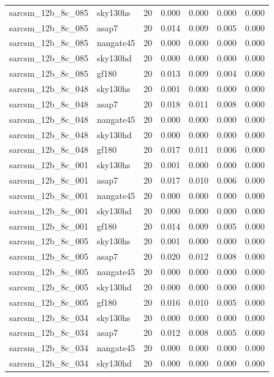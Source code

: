 \begin{tabular}{llrrrrr}
sarcsm\_12b\_8c\_085 & sky130hs & 20 & 0.000 & 0.000 & 0.000 & 0.000 \\
sarcsm\_12b\_8c\_085 & asap7 & 20 & 0.014 & 0.009 & 0.005 & 0.000 \\
sarcsm\_12b\_8c\_085 & nangate45 & 20 & 0.000 & 0.000 & 0.000 & 0.000 \\
sarcsm\_12b\_8c\_085 & sky130hd & 20 & 0.000 & 0.000 & 0.000 & 0.000 \\
sarcsm\_12b\_8c\_085 & gf180 & 20 & 0.013 & 0.009 & 0.004 & 0.000 \\
sarcsm\_12b\_8c\_048 & sky130hs & 20 & 0.001 & 0.000 & 0.000 & 0.000 \\
sarcsm\_12b\_8c\_048 & asap7 & 20 & 0.018 & 0.011 & 0.008 & 0.000 \\
sarcsm\_12b\_8c\_048 & nangate45 & 20 & 0.000 & 0.000 & 0.000 & 0.000 \\
sarcsm\_12b\_8c\_048 & sky130hd & 20 & 0.000 & 0.000 & 0.000 & 0.000 \\
sarcsm\_12b\_8c\_048 & gf180 & 20 & 0.017 & 0.011 & 0.006 & 0.000 \\
sarcsm\_12b\_8c\_001 & sky130hs & 20 & 0.001 & 0.000 & 0.000 & 0.000 \\
sarcsm\_12b\_8c\_001 & asap7 & 20 & 0.017 & 0.010 & 0.006 & 0.000 \\
sarcsm\_12b\_8c\_001 & nangate45 & 20 & 0.000 & 0.000 & 0.000 & 0.000 \\
sarcsm\_12b\_8c\_001 & sky130hd & 20 & 0.000 & 0.000 & 0.000 & 0.000 \\
sarcsm\_12b\_8c\_001 & gf180 & 20 & 0.014 & 0.009 & 0.005 & 0.000 \\
sarcsm\_12b\_8c\_005 & sky130hs & 20 & 0.001 & 0.000 & 0.000 & 0.000 \\
sarcsm\_12b\_8c\_005 & asap7 & 20 & 0.020 & 0.012 & 0.008 & 0.000 \\
sarcsm\_12b\_8c\_005 & nangate45 & 20 & 0.000 & 0.000 & 0.000 & 0.000 \\
sarcsm\_12b\_8c\_005 & sky130hd & 20 & 0.000 & 0.000 & 0.000 & 0.000 \\
sarcsm\_12b\_8c\_005 & gf180 & 20 & 0.016 & 0.010 & 0.005 & 0.000 \\
sarcsm\_12b\_8c\_034 & sky130hs & 20 & 0.000 & 0.000 & 0.000 & 0.000 \\
sarcsm\_12b\_8c\_034 & asap7 & 20 & 0.012 & 0.008 & 0.005 & 0.000 \\
sarcsm\_12b\_8c\_034 & nangate45 & 20 & 0.000 & 0.000 & 0.000 & 0.000 \\
sarcsm\_12b\_8c\_034 & sky130hd & 20 & 0.000 & 0.000 & 0.000 & 0.000 \\

\end{tabular}
